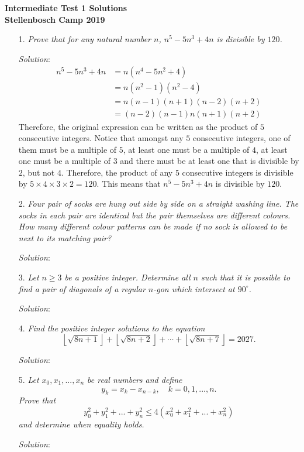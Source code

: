 \documentclass{article}
\begin{document}
\begin{center}
  \textbf{\Large Intermediate Test 1 Solutions}
  \\ \vspace{1em}
  \textbf{\large Stellenbosch Camp 2019}
\end{center}


\begin{enumerate}[1.]

\item[1.] %
\textit{Prove that for any natural number $n$, $n^5-5n^3+4n$ is divisible by $120$. }

\textit{Solution}:
\begin{align*}
  n^5 - 5n^3 + 4n &= n(n^4 - 5n^2 + 4) \\
  &= n(n^2 - 1)(n^2 - 4) \\
  &= n(n - 1)(n + 1)(n - 2)(n + 2) \\
  &= (n - 2)(n - 1)n(n + 1)(n + 2)
\end{align*}
Therefore, the original expression can be written as the product of $5$ consecutive integers. Notice that amongst any $5$ consecutive integers, one of them must be a multiple of $5$, at least one must be a multiple of $4$, at least one must be a multiple of $3$ and there must be at least one that is divisible by $2$, but not $4$.
Therefore, the product of any $5$ consecutive integers is divisible by $5 \times 4 \times 3 \times 2 = 120$. This means that $n^5 - 5n^3 + 4n$ is divisible by $120$.

\item[2.] %
\textit{Four pair of socks are hung out side by side on a straight washing line.
The socks in each pair are identical but the pair themselves are different colours.
How many different colour patterns can be made if no sock is allowed to be next to its matching pair?
}

\textit{Solution}:


\item[3.] %
\textit{Let $n\geq3$ be a positive integer.
Determine all $n$ such that it is possible to find a pair of diagonals of a regular $n$-gon which intersect at $90^\circ$.}

\textit{Solution}:


\item[4.] %
\newcommand{\floorsqrt}[1]{\left\lfloor\sqrt{#1}\right\rfloor} 
\textit{
Find the positive integer solutions to the equation
\[ \floorsqrt{8n+1} +\floorsqrt{8n+2} +\dotsb +\floorsqrt{8n+7} = 2027. \]}

\textit{Solution}:


\item[5.] %
\textit{
Let $x_0, x_1,..., x_n$ be real numbers and define
\[y_k=x_k-x_{n-k}, \quad k=0,1,...,n.\]
Prove that 
\[y_0^2+ y_1^2+...+ y_n^2 \leq 4(x_0^2 + x_1^2 + ... + x_n^2) \]
and determine when equality holds.
}

\textit{Solution}: 

\end{enumerate}
\end{document}
